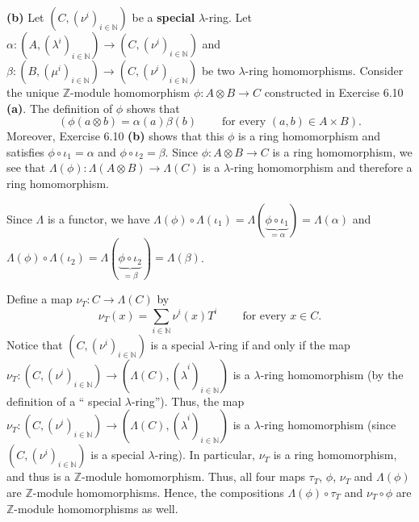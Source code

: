 \documentclass[numbers=enddot,12pt,final,onecolumn,notitlepage]{scrartcl}%
\begin{document}
\textbf{(b)} Let $\left(  C,\left(  \nu^{i}\right)  _{i\in\mathbb{N}}\right)
$ be a \textbf{special} $\lambda$-ring. Let $\alpha:\left(  A,\left(
\lambda^{i}\right)  _{i\in\mathbb{N}}\right)  \rightarrow\left(  C,\left(
\nu^{i}\right)  _{i\in\mathbb{N}}\right)  $ and $\beta:\left(  B,\left(
\mu^{i}\right)  _{i\in\mathbb{N}}\right)  \rightarrow\left(  C,\left(  \nu
^{i}\right)  _{i\in\mathbb{N}}\right)  $ be two $\lambda$-ring homomorphisms.
Consider the unique $\mathbb{Z}$-module homomorphism $\phi:A\otimes
B\rightarrow C$ constructed in Exercise 6.10 \textbf{(a)}. The definition of
$\phi$ shows that%
\begin{equation}
\left(  \phi\left(  a\otimes b\right)  =\alpha\left(  a\right)  \beta\left(
b\right)  \ \ \ \ \ \ \ \ \ \ \text{for every }\left(  a,b\right)  \in A\times
B\right)  . \label{sol.6.11.b.phi-def}%
\end{equation}
Moreover, Exercise 6.10 \textbf{(b)} shows that this $\phi$ is a ring
homomorphism and satisfies $\phi\circ\iota_{1}=\alpha$ and $\phi\circ\iota
_{2}=\beta$. Since $\phi:A\otimes B\rightarrow C$ is a ring homomorphism, we
see that $\Lambda\left(  \phi\right)  :\Lambda\left(  A\otimes B\right)
\rightarrow\Lambda\left(  C\right)  $ is a $\lambda$-ring homomorphism and
therefore a ring homomorphism.

Since $\Lambda$ is a functor, we have $\Lambda\left(  \phi\right)
\circ\Lambda\left(  \iota_{1}\right)  =\Lambda\left(  \underbrace{\phi
\circ\iota_{1}}_{=\alpha}\right)  =\Lambda\left(  \alpha\right)  $ and
$\Lambda\left(  \phi\right)  \circ\Lambda\left(  \iota_{2}\right)
=\Lambda\left(  \underbrace{\phi\circ\iota_{2}}_{=\beta}\right)
=\Lambda\left(  \beta\right)  $.

Define a map $\nu_{T}:C\rightarrow\Lambda\left(  C\right)  $ by%
\[
\nu_{T}\left(  x\right)  =\sum\limits_{i\in\mathbb{N}}\nu^{i}\left(  x\right)
T^{i}\ \ \ \ \ \ \ \ \ \ \text{for every }x\in C.
\]
Notice that $\left(  C,\left(  \nu^{i}\right)  _{i\in\mathbb{N}}\right)  $ is
a special $\lambda$-ring if and only if the map $\nu_{T}:\left(  C,\left(
\nu^{i}\right)  _{i\in\mathbb{N}}\right)  \rightarrow\left(  \Lambda\left(
C\right)  ,\left(  \widehat{\lambda}^{i}\right)  _{i\in\mathbb{N}}\right)  $
is a $\lambda$-ring homomorphism (by the definition of a \textquotedblleft
special $\lambda$-ring\textquotedblright). Thus, the map $\nu_{T}:\left(
C,\left(  \nu^{i}\right)  _{i\in\mathbb{N}}\right)  \rightarrow\left(
\Lambda\left(  C\right)  ,\left(  \widehat{\lambda}^{i}\right)  _{i\in
\mathbb{N}}\right)  $ is a $\lambda$-ring homomorphism (since $\left(
C,\left(  \nu^{i}\right)  _{i\in\mathbb{N}}\right)  $ is a special $\lambda
$-ring). In particular, $\nu_{T}$ is a ring homomorphism, and thus is a
$\mathbb{Z}$-module homomorphism. Thus, all four maps $\tau_{T}$, $\phi$,
$\nu_{T}$ and $\Lambda\left(  \phi\right)  $ are $\mathbb{Z}$-module
homomorphisms. Hence, the compositions $\Lambda\left(  \phi\right)  \circ
\tau_{T}$ and $\nu_{T}\circ\phi$ are $\mathbb{Z}$-module homomorphisms as well.
\end{document}

